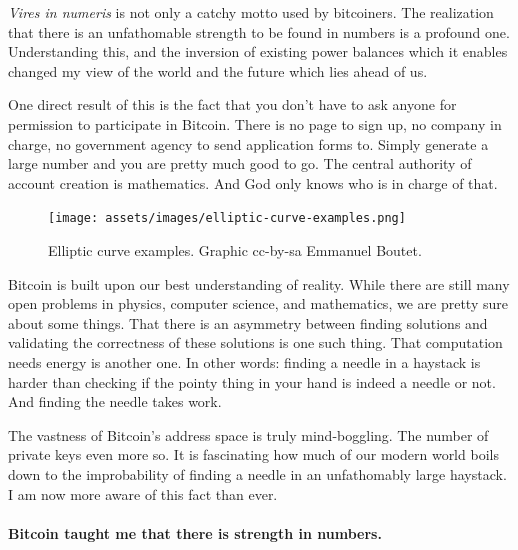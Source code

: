 \textit{Vires in numeris} is not only a catchy motto used by bitcoiners. The
realization that there is an unfathomable strength to be found in
numbers is a profound one. Understanding this, and the inversion of
existing power balances which it enables changed my view of the world
and the future which lies ahead of us.

One direct result of this is the fact that you don't have to ask anyone
for permission to participate in Bitcoin. There is no page to sign up,
no company in charge, no government agency to send application forms to.
Simply generate a large number and you are pretty much good to go. The
central authority of account creation is mathematics. And God only knows
who is in charge of that.

\begin{figure}
  \texttt{[image: assets/images/elliptic-curve-examples.png]}
  \caption{Elliptic curve examples. Graphic cc-by-sa Emmanuel Boutet.}
  \label{fig:elliptic-curve-examples}
\end{figure}

Bitcoin is built upon our best understanding of reality. While there are
still many open problems in physics, computer science, and mathematics,
we are pretty sure about some things. That there is an asymmetry between
finding solutions and validating the correctness of these solutions is
one such thing. That computation needs energy is another one. In other
words: finding a needle in a haystack is harder than checking if the
pointy thing in your hand is indeed a needle or not. And finding the
needle takes work.

The vastness of Bitcoin's address space is truly mind-boggling. The
number of private keys even more so. It is fascinating how much of our
modern world boils down to the improbability of finding a needle in an
unfathomably large haystack. I am now more aware of this fact than ever.

\paragraph{Bitcoin taught me that there is strength in numbers.}

